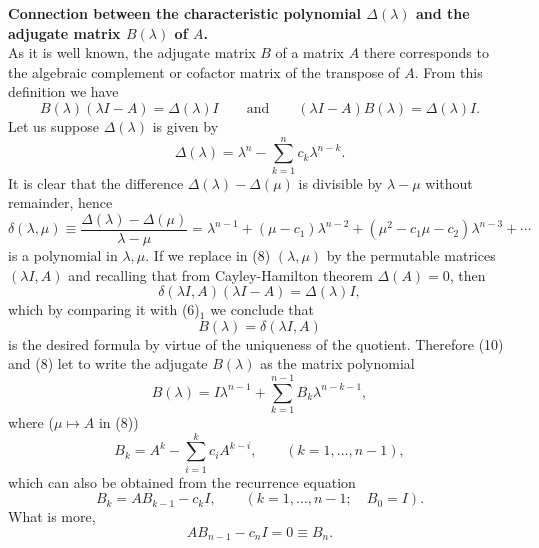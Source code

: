 \documentclass[12pt]{article}
\begin{document}
\textbf{Connection between the characteristic polynomial $\Delta(\lambda)$ and the adjugate matrix $B(\lambda)$ of $A$.} \\
As it is well known, the adjugate matrix $B$ of a matrix $A$ there corresponds to the algebraic complement or cofactor matrix of the transpose of $A$. From this definition we have 
\begin{equation}
B(\lambda)(\lambda I-A)=\Delta(\lambda)I\qquad\mathrm{and}\qquad (\lambda I-A)B(\lambda)=\Delta(\lambda)I.
\end{equation}
Let us suppose $\Delta(\lambda)$ is given by
\begin{equation}
\Delta(\lambda)=\lambda^n-\sum_{k=1}^n c_k\lambda^{n-k}.
\end{equation}
It is clear that the difference $\Delta(\lambda)-\Delta(\mu)$ is divisible by $\lambda-\mu$ without remainder, hence
\begin{equation}
\delta(\lambda,\mu)\equiv \frac{\Delta(\lambda)-\Delta(\mu)}{\lambda-\mu}=\lambda^{n-1}+(\mu-c_1)\lambda^{n-2}+(\mu^2-c_1\mu-c_2)\lambda^{n-3}+\cdots
\end{equation}
is a polynomial in $\lambda, \mu$. If we replace in (8) $(\lambda, \mu)$ by the permutable matrices $(\lambda I, A)$ and recalling that from Cayley-Hamilton theorem $\Delta(A)=0$, then
\begin{equation}
\delta(\lambda I,A)(\lambda I-A)= \Delta(\lambda)I,
\end{equation}
which by comparing it with (6)${}_1$ we conclude that
\begin{equation}
B(\lambda)=\delta(\lambda I, A)
\end{equation}
is the desired formula by virtue of the uniqueness of the quotient. Therefore (10) and (8) let to write the adjugate $B(\lambda)$ as the matrix polynomial
\begin{equation}
B(\lambda)=I\lambda^{n-1}+\sum_{k=1}^{n-1}B_k\lambda^{n-k-1},
\end{equation}
where ($\mu\mapsto A$ in (8))
\begin{equation}
B_k=A^k-\sum_{i=1}^k c_iA^{k-i}, \qquad (k=1,\ldots, n-1),
\end{equation}
which can also be obtained from the recurrence equation
\begin{equation}
B_k=AB_{k-1}-c_kI, \qquad (k=1, \ldots, n-1; \quad B_0=I).
\end{equation}
What is more,
\begin{equation}
AB_{n-1}-c_nI=0\equiv B_n.
\end{equation}
\end{document}
